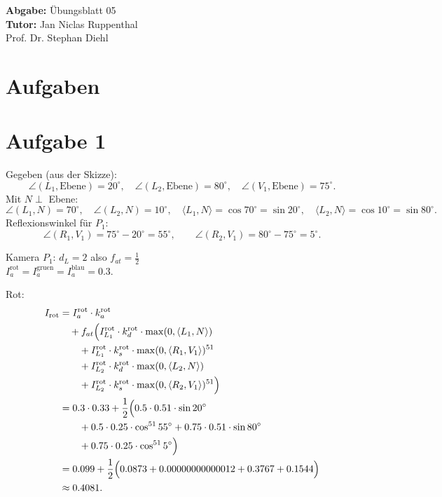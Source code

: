 \documentclass[11pt,a4paper]{article}
\title{\course}
\author{\studentname\\Matrikelnummer: \studentnumber\\\institute}
\date{\today}
\newcommand{\sheetnumber}{05}
\newcommand{\tutor}{Jan Niclas Ruppenthal\\Prof. Dr. Stephan Diehl}
\begin{document}
\maketitle

\begin{center}
    \textbf{Abgabe:} \"Ubungsblatt \sheetnumber \\
    \vspace{4mm}
    \textbf{Tutor:} \tutor
\end{center}

\bigskip

\section*{Aufgaben}

\section{Aufgabe 1}
Gegeben (aus der Skizze):
\[
\angle(L_1,\text{Ebene})=20^\circ,\quad
\angle(L_2,\text{Ebene})=80^\circ,\quad
\angle(V_1,\text{Ebene})=75^\circ.
\]
Mit $N \perp$ Ebene:
\[
\angle(L_1,N)=70^\circ,\quad \angle(L_2,N)=10^\circ,
\quad \langle L_1,N\rangle=\cos 70^\circ=\sin 20^\circ,
\quad \langle L_2,N\rangle=\cos 10^\circ=\sin 80^\circ.
\]
Reflexionswinkel für $P_1$:
\[
\angle(R_1,V_1)=75^\circ-20^\circ=55^\circ,
\qquad
\angle(R_2,V_1)=80^\circ-75^\circ=5^\circ.
\]

Kamera $P_1$:
$d_L = 2$ also $f_{at} = \frac{1}{2}$ \\
$I_a^{\mathrm{rot}} = I_a^{\mathrm{gruen}} = I_a^{\mathrm{blau}} = 0.3$.

Rot:
\[
\begin{aligned}
I_{\mathrm{rot}}
&= I_a^{\mathrm{rot}} \cdot k_a^{\mathrm{rot}} \\
&\quad + f_{at}\Bigl(
 I_{L_1}^{\mathrm{rot}} \cdot k_d^{\mathrm{rot}} \cdot \max(0,\langle L_1,N\rangle) \\
&\qquad + I_{L_1}^{\mathrm{rot}} \cdot k_s^{\mathrm{rot}} \cdot \max(0,\langle R_1,V_1\rangle)^{51} \\
&\qquad + I_{L_2}^{\mathrm{rot}} \cdot k_d^{\mathrm{rot}} \cdot \max(0,\langle L_2,N\rangle) \\
&\qquad + I_{L_2}^{\mathrm{rot}} \cdot k_s^{\mathrm{rot}} \cdot \max(0,\langle R_2,V_1\rangle)^{51}
\Bigr) \\
&= 0.3 \cdot 0.33
 + \frac{1}{2}\Bigl(
 0.5 \cdot 0.51 \cdot \sin 20^\circ \\
&\qquad + 0.5 \cdot 0.25 \cdot \cos^{51} 55^\circ
 + 0.75 \cdot 0.51 \cdot \sin 80^\circ \\
&\qquad + 0.75 \cdot 0.25 \cdot \cos^{51} 5^\circ
\Bigr) \\
&= 0.099
 + \frac{1}{2}\Bigl(0.0873 + 0.00000000000012 + 0.3767 + 0.1544\Bigr) \\
&\approx 0.4081.
\end{aligned}
\]
\end{document}
